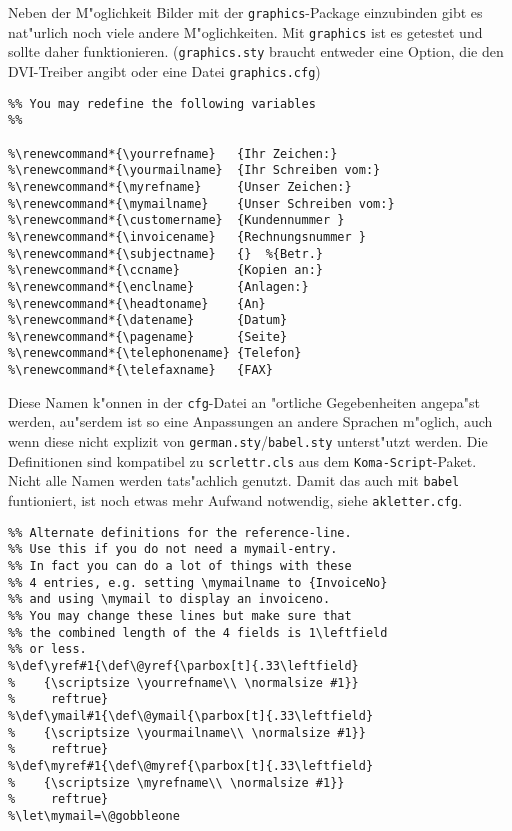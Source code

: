 \documentclass[a4paper]{article}
\begin{document}
Neben der M"oglichkeit Bilder mit der \texttt{graphics}-Package 
einzubinden gibt es nat"urlich noch viele andere M"oglichkeiten. 
Mit \texttt{graphics} ist es getestet und sollte daher 
funktionieren. (\texttt{graphics.sty} braucht entweder eine 
Option, die den DVI-Treiber angibt oder eine Datei 
\texttt{graphics.cfg})

\begin{verbatim}
%% You may redefine the following variables
%%

%\renewcommand*{\yourrefname}   {Ihr Zeichen:}
%\renewcommand*{\yourmailname}  {Ihr Schreiben vom:}
%\renewcommand*{\myrefname}     {Unser Zeichen:}
%\renewcommand*{\mymailname}    {Unser Schreiben vom:}
%\renewcommand*{\customername}  {Kundennummer }
%\renewcommand*{\invoicename}   {Rechnungsnummer }
%\renewcommand*{\subjectname}   {}  %{Betr.}
%\renewcommand*{\ccname}        {Kopien an:}
%\renewcommand*{\enclname}      {Anlagen:}
%\renewcommand*{\headtoname}    {An}
%\renewcommand*{\datename}      {Datum}
%\renewcommand*{\pagename}      {Seite}
%\renewcommand*{\telephonename} {Telefon}
%\renewcommand*{\telefaxname}   {FAX}
\end{verbatim}

Diese Namen k"onnen in der \texttt{cfg}-Datei an "ortliche 
Gegebenheiten angepa"st werden, au"serdem ist so eine Anpassungen 
an andere Sprachen m"oglich, auch wenn diese nicht explizit von 
\texttt{german.sty}/\texttt{babel.sty} unterst"utzt werden. Die 
Definitionen sind kompatibel zu \texttt{scrlettr.cls} aus dem 
\texttt{Koma-Script}-Paket. Nicht alle Namen werden tats"achlich 
genutzt. Damit das auch mit \texttt{babel} funtioniert, ist noch 
etwas mehr Aufwand notwendig, siehe \texttt{akletter.cfg}.

\begin{verbatim}
%% Alternate definitions for the reference-line.
%% Use this if you do not need a mymail-entry.
%% In fact you can do a lot of things with these
%% 4 entries, e.g. setting \mymailname to {InvoiceNo}
%% and using \mymail to display an invoiceno.
%% You may change these lines but make sure that
%% the combined length of the 4 fields is 1\leftfield
%% or less.
%\def\yref#1{\def\@yref{\parbox[t]{.33\leftfield}
%    {\scriptsize \yourrefname\\ \normalsize #1}}
%     reftrue}
%\def\ymail#1{\def\@ymail{\parbox[t]{.33\leftfield}
%    {\scriptsize \yourmailname\\ \normalsize #1}}
%     reftrue}
%\def\myref#1{\def\@myref{\parbox[t]{.33\leftfield}
%    {\scriptsize \myrefname\\ \normalsize #1}}
%     reftrue}
%\let\mymail=\@gobbleone
\end{verbatim}
\end{document}

